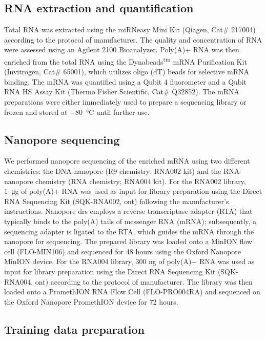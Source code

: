 \documentclass[pdflatex, sn-mathphys-num, lineno]{sn-jnl}%
\theoremstyle{thmstyleone}%
\theoremstyle{thmstyletwo}%
\theoremstyle{thmstylethree}%
\begin{document}
\subsection{RNA extraction and quantification}

Total RNA was extracted using the miRNeasy Mini Kit (Qiagen, Cat\# 217004) according to the protocol of manufacturer.
The quality and concentration of RNA were assessed using an Agilent 2100 Bioanalyzer.
Poly(A)+ RNA was then enriched from the total RNA using the Dynabeads\textsuperscript{tm} mRNA Purification Kit (Invitrogen, Cat\# 65001), which utilizes oligo (dT) beads for selective mRNA binding.
The mRNA was quantified using a Qubit 4 fluorometer and a Qubit RNA HS Assay Kit (Thermo Fisher Scientific, Cat\# Q32852).
The mRNA preparations were either immediately used to prepare a sequencing library or frozen and stored at \SI{-80}{\degreeCelsius} until further use.

\subsection{Nanopore sequencing}

We performed nanopore sequencing of the enriched mRNA using two different chemistries: the DNA-nanopore (R9 chemistry; RNA002 kit) and the RNA-nanopore chemistry (RNA chemistry; RNA004 kit).
For the RNA002 library, \SI{1}{\micro\gram} of poly(A)+ RNA was used as input for library preparation using the Direct RNA Sequencing Kit (SQK-RNA002, \gls{ont}) following the manufacturer's instructions.
Nanopore \gls{drs} employs a reverse transcriptase adapter (RTA) that typically binds to the poly(A) tails of messenger RNA (mRNA); subsequently, a sequencing adapter is ligated to the RTA, which guides the mRNA through the nanopore for sequencing.
The prepared library was loaded onto a MinION flow cell (FLO-MIN106) and sequenced for 48 hours using the Oxford Nanopore MinION device.
For the RNA004 library, 300 ng of poly(A)+ RNA was used as input for library preparation using the Direct RNA Sequencing Kit (SQK-RNA004, \gls{ont}) according to the protocol of manufacturer.
The library was then loaded onto a PromethION RNA Flow Cell (FLO-PRO004RA) and sequenced on the Oxford Nanopore PromethION device for 72 hours.

\subsection{Training data preparation}\label{ssec:data}
\end{document}
